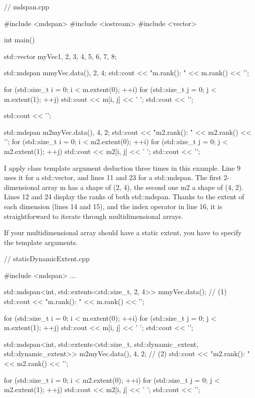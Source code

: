 \begin{cpp}
// mdspan.cpp

#include <mdspan>
#include <iostream>
#include <vector>

int main() {

	std::vector myVec{1, 2, 3, 4, 5, 6, 7, 8};
	
	std::mdspan m{myVec.data(), 2, 4};
	std::cout << "m.rank(): " << m.rank() << '\n';
	
	for (std::size_t i = 0; i < m.extent(0); ++i) {
		for (std::size_t j = 0; j < m.extent(1); ++j) {
			std::cout << m[i, j] << ' ';
		}
		std::cout << '\n';
	}
	
	std::cout << '\n';
	
	std::mdspan m2{myVec.data(), 4, 2};
	std::cout << "m2.rank(): " << m2.rank() << '\n';
	for (std::size_t i = 0; i < m2.extent(0); ++i) {
		for (std::size_t j = 0; j < m2.extent(1); ++j) {
			std::cout << m2[i, j] << ' ';
		}
		std::cout << '\n';
	}

}
\end{cpp}

I apply class template argument deduction three times in this example. Line 9 uses it for a std::vector, and lines 11 and 23 for a std::mdspan. The first 2-dimensional array m has a shape of (2, 4), the second one m2 a shape of (4, 2). Lines 12 and 24 display the ranks of both std::mdspan. Thanks to the extent of each dimension (lines 14 and 15), and the index operator in line 16, it is straightforward to iterate through multidimensional arrays.


If your multidimensional array should have a static extent, you have to specify the template arguments.


\begin{cpp}
// staticDynamicExtent.cpp

#include <mdspan>
...

std::mdspan<int, std::extents<std::size_t, 2, 4>> m{myVec.data()}; // (1)
std::cout << "m.rank(): " << m.rank() << '\n';

for (std::size_t i = 0; i < m.extent(0); ++i) {
	for (std::size_t j = 0; j < m.extent(1); ++j) {
		std::cout << m[i, j] << ' ';
	}
	std::cout << '\n';
}

std::mdspan<int, std::extents<std::size_t, std::dynamic_extent, std::dynamic_extent>>
				m2{myVec.data(), 4, 2}; // (2)
std::cout << "m2.rank(): " << m2.rank() << '\n';

for (std::size_t i = 0; i < m2.extent(0); ++i) {
	for (std::size_t j = 0; j < m2.extent(1); ++j) {
		std::cout << m2[i, j] << ' ';
	}
	std::cout << '\n';
}
\end{cpp}

